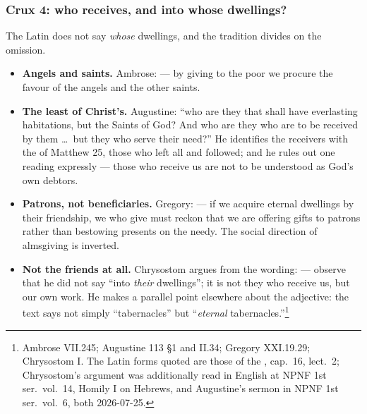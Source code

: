 \subsubsection*{Crux 4: who receives, and into whose dwellings?}

 The Latin does not say
\emph{whose} dwellings, and the tradition divides on the omission.

\begin{itemize}[leftmargin=1.4em, itemsep=0.2em]
\item \textbf{Angels and saints.} Ambrose:  --- by giving to the poor
we procure the favour of the angels and the other saints.
\item \textbf{The least of Christ's.} Augustine: ``who are they that shall have
everlasting habitations, but the Saints of God? And who are they who are to be
received by them \dots\ but they who serve their need{?}'' He identifies the
receivers with the  of Matthew 25, those who left all and
followed; and he rules out one reading expressly --- those who receive us are
not to be understood as God's own debtors.
\item \textbf{Patrons, not beneficiaries.} Gregory:  --- if we acquire eternal
dwellings by their friendship, we who give must reckon that we are offering
gifts to patrons rather than bestowing presents on the needy. The social
direction of almsgiving is inverted.
\item \textbf{Not the friends at all.} Chrysostom argues from the wording:
 --- observe that he did not say ``into
\emph{their} dwellings''; it is not they who receive us, but our own work. He
makes a parallel point elsewhere about the adjective: the text says not simply
``tabernacles'' but ``\emph{eternal} tabernacles.''\footnote{Ambrose  VII.245; Augustine  113 §1 and 
II.34; Gregory \work{Moralia in Iob} XXI.19.29; Chrysostom 
I. The Latin forms quoted are those of the \work{Catena aurea}, cap.\ 16,
lect.\ 2; Chrysostom's argument was additionally read in English at NPNF 1st
ser.\ vol.\ 14, Homily I on Hebrews, and Augustine's sermon in NPNF 1st ser.\
vol.\ 6, both 2026-07-25.}
\end{itemize}

